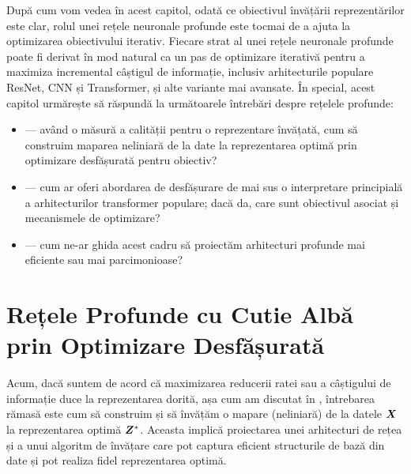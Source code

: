 \documentclass[../../book-main_ro.tex]{subfiles}
\begin{document}
După cum vom vedea în acest capitol, odată ce obiectivul învățării reprezentărilor este clar, rolul unei rețele neuronale profunde este tocmai de a ajuta la optimizarea obiectivului iterativ. Fiecare strat al unei rețele neuronale profunde poate fi derivat în mod natural ca un pas de optimizare iterativă pentru a maximiza incremental câștigul de informație, inclusiv arhitecturile populare ResNet, CNN și Transformer, și alte variante mai avansate. În special, acest capitol urmărește să răspundă la următoarele întrebări despre rețelele profunde:
\begin{itemize}
    \item {} --- având o măsură a calității pentru o reprezentare învățată, cum să construim maparea neliniară de la date la reprezentarea optimă prin optimizare desfășurată pentru obiectiv?
    \item {} --- cum ar oferi abordarea de desfășurare de mai sus o interpretare principială a arhitecturilor transformer populare; dacă da, care sunt obiectivul asociat și mecanismele de optimizare? 
    \item {} --- cum ne-ar ghida acest cadru să proiectăm arhitecturi profunde mai eficiente sau mai parcimonioase?
\end{itemize}


















\section{Rețele Profunde cu Cutie Albă prin Optimizare Desfășurată}\label{sec:chap4-white-box-model-via-unrolling}


Acum, dacă suntem de acord că maximizarea reducerii ratei sau a câștigului de informație duce la reprezentarea dorită, așa cum am discutat în , întrebarea rămasă este cum să construim și să învățăm o mapare (neliniară) de la datele $\bm{X}$ la reprezentarea optimă $\bm{Z}^*$. Aceasta implică proiectarea unei arhitecturi de rețea și a unui algoritm de învățare care pot captura eficient structurile de bază din date și pot realiza fidel reprezentarea optimă. 
\end{document}
